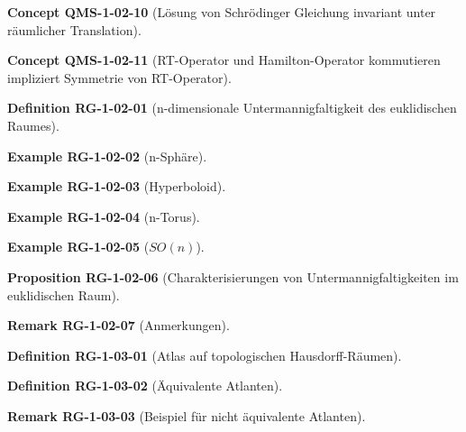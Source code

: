 \documentclass[10pt, letterpaper]{article}
\newcommand{\CustomHeading}[3]{%
  \par\medskip\noindent%
  \textbf{#1 #2} \textnormal{(#3)}.\enskip%
}
\newenvironment{DEF}[2]{\CustomHeading{Definition}{#1}{#2}}{}
\newenvironment{PROP}[2]{\CustomHeading{Proposition}{#1}{#2}}{}
\newenvironment{REM}[2]{\CustomHeading{Remark}{#1}{#2}}{}
\newenvironment{EXA}[2]{\CustomHeading{Example}{#1}{#2}}{}
\newenvironment{CONC}[2]{\CustomHeading{Concept}{#1}{#2}}{}
\begin{document}
\begin{CONC}{QMS-1-02-10}{Lösung von Schrödinger Gleichung invariant unter räumlicher Translation}
\end{CONC}

\begin{CONC}{QMS-1-02-11}{RT-Operator und Hamilton-Operator kommutieren impliziert Symmetrie von RT-Operator}
\end{CONC}

\begin{DEF}{RG-1-02-01}{n-dimensionale Untermannigfaltigkeit des euklidischen Raumes}
\end{DEF}

\begin{EXA}{RG-1-02-02}{n-Sphäre}
\end{EXA}

\begin{EXA}{RG-1-02-03}{Hyperboloid}
\end{EXA}

\begin{EXA}{RG-1-02-04}{n-Torus}
\end{EXA}

\begin{EXA}{RG-1-02-05}{$SO(n)$}
\end{EXA}

\begin{PROP}{RG-1-02-06}{Charakterisierungen von Untermannigfaltigkeiten im euklidischen Raum}
\end{PROP}

\begin{REM}{RG-1-02-07}{Anmerkungen}
\end{REM}

\begin{DEF}{RG-1-03-01}{Atlas auf topologischen Hausdorff-Räumen}
\end{DEF}

\begin{DEF}{RG-1-03-02}{Äquivalente Atlanten}
\end{DEF}

\begin{REM}{RG-1-03-03}{Beispiel für nicht äquivalente Atlanten}
\end{REM}
\end{document}
